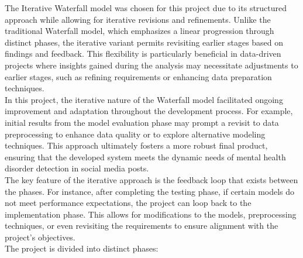 \noindent
The Iterative Waterfall model was chosen for this project due to its structured approach while allowing for iterative revisions and refinements. Unlike the traditional Waterfall model, which emphasizes a linear progression through distinct phases, the iterative variant permits revisiting earlier stages based on findings and feedback. This flexibility is particularly beneficial in data-driven projects where insights gained during the analysis may necessitate adjustments to earlier stages, such as refining requirements or enhancing data preparation techniques. \\

\noindent
In this project, the iterative nature of the Waterfall model facilitated ongoing improvement and adaptation throughout the development process. For example, initial results from the model evaluation phase may prompt a revisit to data preprocessing to enhance data quality or to explore alternative modeling techniques. This approach ultimately fosters a more robust final product, ensuring that the developed system meets the dynamic needs of mental health disorder detection in social media posts. \\

\noindent
The key feature of the iterative approach is the feedback loop that exists between the phases. For instance, after completing the testing phase, if certain models do not meet performance expectations, the project can loop back to the implementation phase. This allows for modifications to the models, preprocessing techniques, or even revisiting the requirements to ensure alignment with the project's objectives. \\

\noindent
The project is divided into distinct phases:

